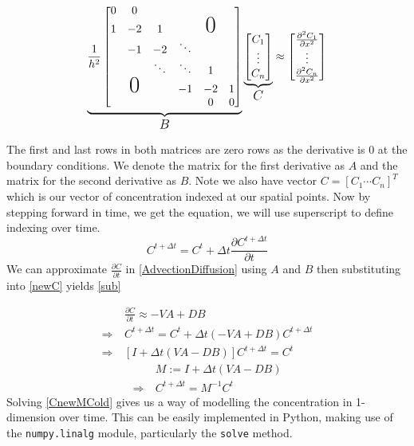 \documentclass{article}
\begin{document}
\begin{equation} \label{CentralDifference2}
        \underbrace{\frac{1}{h^2}
        \begin{bmatrix}
        0 & 0 &  & & \\
        1 & -2 & 1 & &\text{\huge{$0$}} & \\
         & -1 & -2 & \ddots &\\
         & & \ddots & \ddots & 1 \\
         & \text{\huge{$0$}} & & -1 & -2 & 1 \\
         & & & & 0 & 0
        \end{bmatrix}}_\text{\large{$B$}}
        \underbrace{\begin{bmatrix}
            C_1 \\ \vdots \\ C_n
        \end{bmatrix}}_\text{\large{$C$}} \approx
        \begin{bmatrix}
            \frac{\partial^2 C_1}{\partial x^2} \\ \vdots \\ \frac{\partial^2 C_n}{\partial x^2}
        \end{bmatrix}
\end{equation}

The first and last rows in both matrices are zero rows as the derivative is 0 at the boundary conditions. We denote the matrix for the first derivative as $A$ and the matrix for the second derivative as $B$. Note we also have vector $C = [C_1 \cdots C_n]^T$ which is our vector of concentration indexed at our spatial points. Now by stepping forward in time, we get the equation, we will use superscript to define indexing over time.
\begin{equation}
    C^{t+\Delta t} = C^{t} + \Delta t \frac{\partial C^{t+\Delta t}}{\partial t}
    \label{newC}
\end{equation}
We can approximate $\frac{\partial C}{\partial t}$ in \eqref{AdvectionDiffusion} using $A$ and $B$ then substituting into \eqref{newC} yields \eqref{sub}

\begin{equation} \label{sub}
    \begin{split}
        & \frac{\partial C}{\partial t} \approx -VA + DB \\
        \Longrightarrow \ & C^{t+\Delta t} = C^{t} + \Delta t (-VA + DB) C^{t+\Delta t} \\
        \Longrightarrow \ & [I + \Delta t(VA - DB)]C^{t+\Delta t} = C^{t}
    \end{split}
\end{equation}
\begin{equation} \label{CnewMCold}
    \begin{split}
        & M := I + \Delta t(VA - DB) \\
        \Longrightarrow \ &  C^{t+\Delta t} = M^{-1} C^{t}
    \end{split}
\end{equation}
Solving \eqref{CnewMCold} gives us a way of modelling the concentration in 1-dimension over time. This can be easily implemented in Python, making use of the \verb|numpy.linalg| module, particularly the \verb|solve| method.
\end{document}
